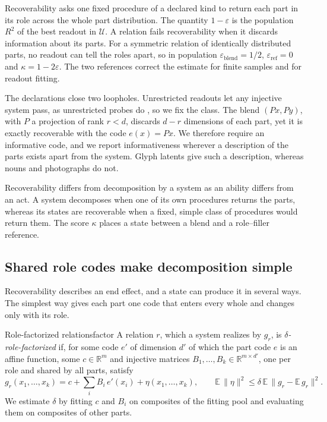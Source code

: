 \documentclass[10pt]{article}
\theoremstyle{plain}
\theoremstyle{remark}
\newcommand{\R}{\mathbb{R}}
\newcommand{\U}{\mathcal{U}}
\begin{document}
Recoverability asks one fixed procedure of a declared kind to return each part in its role across the whole part distribution. The quantity $1 - \varepsilon$ is the population $R^2$ of the best readout in $\U$. A relation fails recoverability when it discards information about its parts. For a symmetric relation of identically distributed parts, no readout can tell the roles apart, so in population $\varepsilon_{\mathrm{blend}} = 1/2$, $\varepsilon_{\mathrm{ref}} = 0$ and $\kappa = 1 - 2\varepsilon$. The two references correct the estimate for finite samples and for readout fitting.

The declarations close two loopholes. Unrestricted readouts let any injective system pass, as unrestricted probes do \citep{hewitt2019}, so we fix the class. The blend $(Px, Py)$, with $P$ a projection of rank $r < d$, discards $d - r$ dimensions of each part, yet it is exactly recoverable with the code $e(x) = Px$. We therefore require an informative code, and we report informativeness wherever a description of the parts exists apart from the system. Glyph latents give such a description, whereas nouns and photographs do not.

Recoverability differs from decomposition by a system as an ability differs from an act. A system decomposes when one of its own procedures returns the parts, whereas its states are recoverable when a fixed, simple class of procedures would return them. The score $\kappa$ places a state between a blend and a role--filler reference.

\subsection{Shared role codes make decomposition simple}
\label{sec:mechanics}

Recoverability describes an end effect, and a state can produce it in several ways. The simplest way gives each part one code that enters every whole and changes only with its role.

\begin{defbox}{Role-factorized relations}{factor}
A relation $r$, which a system realizes by $g_r$, is \emph{$\delta$-role-factorized} if, for some code $e'$ of dimension $d'$ of which the part code $e$ is an affine function, some $c \in \R^m$ and injective matrices $B_1, \ldots, B_k \in \R^{m \times d'}$, one per role and shared by all parts, satisfy
\begin{equation}
  g_r(x_1, \ldots, x_k) = c + \textstyle\sum_{i} B_i\, e'(x_i) + \eta(x_1, \ldots, x_k), \qquad \mathbb{E}\,\lVert \eta \rVert^2 \le \delta\, \mathbb{E}\,\lVert g_r - \mathbb{E}\,g_r \rVert^2 .
  \label{eq:factor}
\end{equation}
We estimate $\delta$ by fitting $c$ and $B_i$ on composites of the fitting pool and evaluating them on composites of other parts.
\end{defbox}
\end{document}
